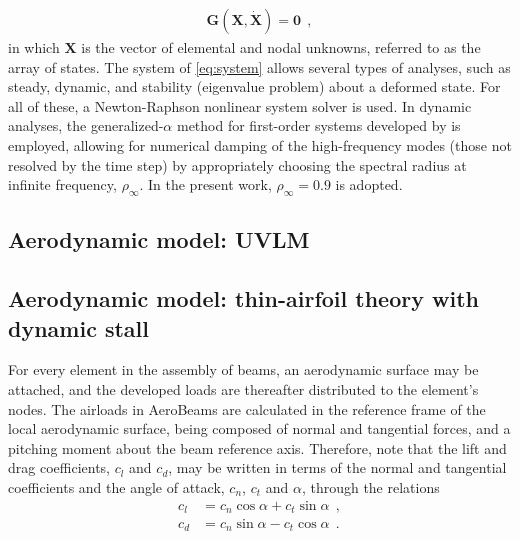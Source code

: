 \documentclass[journal]{new-aiaa}
\newcommand{\vect}[1]{\bm{#1}}
\def\lp{\left(}
\def\rp{\right)}
\def\zv{\vect{0}}
\def\Sys{\mathcal{\vect{G}}}
\def\X{\vect{X}}
\def\Xdot{\dot{\X}}
\begin{document}
\begin{align}
    \Sys\lp\X,\Xdot\rp = \zv \ \ ,
    \label{eq:system}
\end{align}
in which $\X$ is the vector of elemental and nodal unknowns, referred to as the array of states. The system of \cref{eq:system} allows several types of analyses, such as steady, dynamic, and stability (eigenvalue problem) about a deformed state. For all of these, a Newton-Raphson nonlinear system solver is used. In dynamic analyses, the generalized-$\alpha$ method for first-order systems developed by \cite{jansen2000generalized} is employed, allowing for numerical damping of the high-frequency modes (those not resolved by the time step) by appropriately choosing the spectral radius at infinite frequency, $\rho_\infty$. In the present work, $\rho_\infty=0.9$ is adopted.

\subsection{Aerodynamic model: UVLM}

\subsection{Aerodynamic model: thin-airfoil theory with dynamic stall}

For every element in the assembly of beams, an aerodynamic surface may be attached, and the developed loads are thereafter distributed to the element's nodes. The airloads in AeroBeams are calculated in the reference frame of the local aerodynamic surface, being composed of normal and tangential forces, and a pitching moment about the beam reference axis. Therefore, note that the lift and drag coefficients, $c_l$ and $c_d$, may be written in terms of the normal and tangential coefficients and the angle of attack, $c_n$, $c_t$ and $\alpha$, through the relations
\begin{align}
    c_l &= c_n\cos{\alpha} + c_t\sin{\alpha} \ \ ,
    \\
    c_d &= c_n\sin{\alpha} - c_t\cos{\alpha} \ \ .
    \label{eq:cl_cd}
\end{align}
\end{document}
